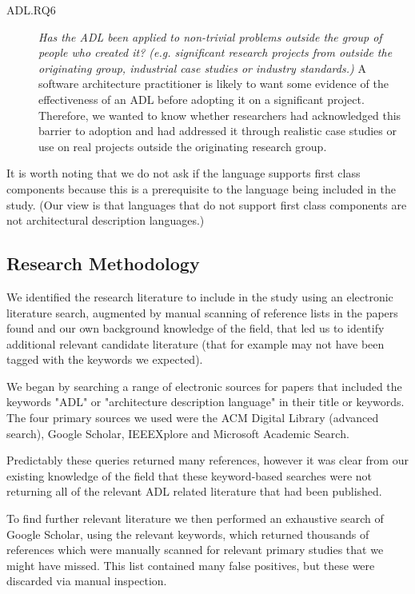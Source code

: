 \begin{description}
\item[ADL.RQ6] \emph{Has the ADL been applied to non-trivial problems outside the group of people who created it? (e.g. significant research projects from outside the originating group, industrial case studies or industry standards.)}  A software architecture practitioner is likely to want some evidence of the effectiveness of an ADL before adopting it on a significant project.  Therefore, we wanted to know whether researchers had acknowledged this barrier to adoption and had addressed it through realistic case studies or use on real projects outside the originating research group.

\end{description}

It is worth noting that we do not ask if the language supports first class components because this is a prerequisite to the language being included in the study.  (Our view is that languages that do not support first class components are not architectural description languages.) 

\subsection{Research Methodology}

We identified the research literature to include in the study using an electronic literature search, augmented by manual scanning of reference lists in the papers found and our own background knowledge of the field, that led us to identify additional relevant candidate literature (that for example may not have been tagged with the keywords we expected).

We began by searching a range of electronic sources for papers that included the keywords "ADL" or "architecture description language" in their title or keywords.  The four primary sources we used were the ACM Digital Library (advanced search), Google Scholar, IEEEXplore and Microsoft Academic Search.

Predictably these queries returned many references, however it was clear from our existing knowledge of the field that these keyword-based searches were not returning all of the relevant ADL related literature that had been published.

To find further relevant literature we then performed an exhaustive search of Google Scholar, using the relevant keywords, which returned thousands of references which were manually scanned for relevant primary studies that we might have missed.  This list contained many false positives, but these were discarded via manual inspection. 

